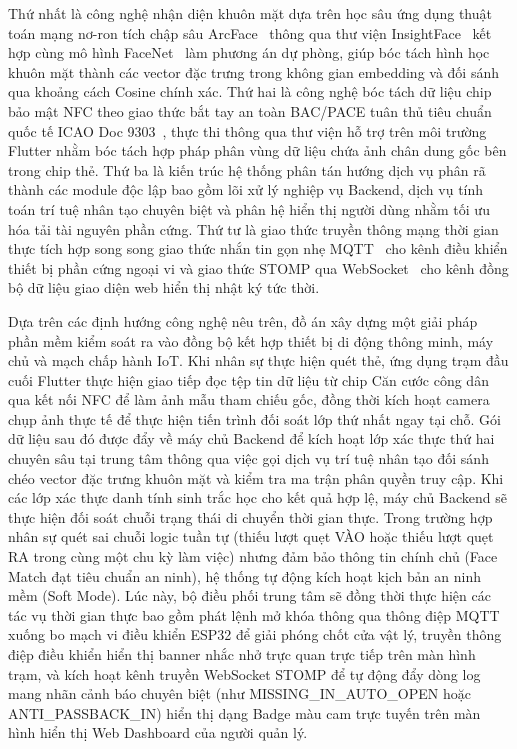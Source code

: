 \documentclass[../DoAn.tex]{subfiles}
\begin{document}
Thứ nhất là công nghệ nhận diện khuôn mặt dựa trên học sâu ứng dụng thuật toán mạng nơ-ron tích chập sâu ArcFace~\cite{deng2019arcface} thông qua thư viện InsightFace~\cite{insightface_github} kết hợp cùng mô hình FaceNet~\cite{facenet2015} làm phương án dự phòng, giúp bóc tách hình học khuôn mặt thành các vector đặc trưng trong không gian embedding và đối sánh qua khoảng cách Cosine chính xác. Thứ hai là công nghệ bóc tách dữ liệu chip bảo mật NFC theo giao thức bắt tay an toàn BAC/PACE tuân thủ tiêu chuẩn quốc tế ICAO Doc 9303~\cite{icao9303}, thực thi thông qua thư viện hỗ trợ trên môi trường Flutter nhằm bóc tách hợp pháp phân vùng dữ liệu chứa ảnh chân dung gốc bên trong chip thẻ. Thứ ba là kiến trúc hệ thống phân tán hướng dịch vụ phân rã thành các module độc lập bao gồm lõi xử lý nghiệp vụ Backend, dịch vụ tính toán trí tuệ nhân tạo chuyên biệt và phân hệ hiển thị người dùng nhằm tối ưu hóa tải tài nguyên phần cứng. Thứ tư là giao thức truyền thông mạng thời gian thực tích hợp song song giao thức nhắn tin gọn nhẹ MQTT~\cite{mqtt5} cho kênh điều khiển thiết bị phần cứng ngoại vi và giao thức STOMP qua WebSocket~\cite{rfc6455} cho kênh đồng bộ dữ liệu giao diện web hiển thị nhật ký tức thời.

Dựa trên các định hướng công nghệ nêu trên, đồ án xây dựng một giải pháp phần mềm kiểm soát ra vào đồng bộ kết hợp thiết bị di động thông minh, máy chủ và mạch chấp hành IoT. Khi nhân sự thực hiện quét thẻ, ứng dụng trạm đầu cuối Flutter thực hiện giao tiếp đọc tệp tin dữ liệu từ chip Căn cước công dân qua kết nối NFC để làm ảnh mẫu tham chiếu gốc, đồng thời kích hoạt camera chụp ảnh thực tế để thực hiện tiến trình đối soát lớp thứ nhất ngay tại chỗ. Gói dữ liệu sau đó được đẩy về máy chủ Backend để kích hoạt lớp xác thực thứ hai chuyên sâu tại trung tâm thông qua việc gọi dịch vụ trí tuệ nhân tạo đối sánh chéo vector đặc trưng khuôn mặt và kiểm tra ma trận phân quyền truy cập. Khi các lớp xác thực danh tính sinh trắc học cho kết quả hợp lệ, máy chủ Backend sẽ thực hiện đối soát chuỗi trạng thái di chuyển thời gian thực. Trong trường hợp nhân sự quét sai chuỗi logic tuần tự (thiếu lượt quẹt VÀO hoặc thiếu lượt quẹt RA trong cùng một chu kỳ làm việc) nhưng đảm bảo thông tin chính chủ (Face Match đạt tiêu chuẩn an ninh), hệ thống tự động kích hoạt kịch bản an ninh mềm (Soft Mode). Lúc này, bộ điều phối trung tâm sẽ đồng thời thực hiện các tác vụ thời gian thực bao gồm phát lệnh mở khóa thông qua thông điệp MQTT xuống bo mạch vi điều khiển ESP32 để giải phóng chốt cửa vật lý, truyền thông điệp điều khiển hiển thị banner nhắc nhở trực quan trực tiếp trên màn hình trạm, và kích hoạt kênh truyền WebSocket STOMP để tự động đẩy dòng log mang nhãn cảnh báo chuyên biệt (như MISSING\_IN\_AUTO\_OPEN hoặc ANTI\_PASSBACK\_IN) hiển thị dạng Badge màu cam trực tuyến trên màn hình hiển thị Web Dashboard của người quản lý.
\end{document}
